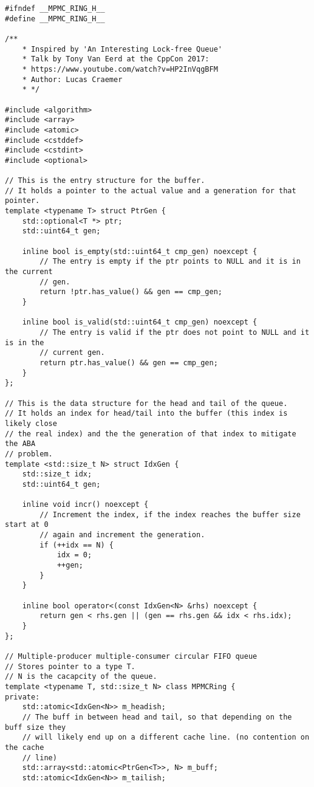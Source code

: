 \begin{lstlisting}[caption={Van Eerd's "An Interesting Lock-free Queue"},label=append_mpmc]
#ifndef __MPMC_RING_H__
#define __MPMC_RING_H__

/**
    * Inspired by 'An Interesting Lock-free Queue'
    * Talk by Tony Van Eerd at the CppCon 2017:
    * https://www.youtube.com/watch?v=HP2InVqgBFM
    * Author: Lucas Craemer
    * */

#include <algorithm>
#include <array>
#include <atomic>
#include <cstddef>
#include <cstdint>
#include <optional>

// This is the entry structure for the buffer.
// It holds a pointer to the actual value and a generation for that pointer.
template <typename T> struct PtrGen {
    std::optional<T *> ptr;
    std::uint64_t gen;

    inline bool is_empty(std::uint64_t cmp_gen) noexcept {
        // The entry is empty if the ptr points to NULL and it is in the current
        // gen.
        return !ptr.has_value() && gen == cmp_gen;
    }

    inline bool is_valid(std::uint64_t cmp_gen) noexcept {
        // The entry is valid if the ptr does not point to NULL and it is in the
        // current gen.
        return ptr.has_value() && gen == cmp_gen;
    }
};

// This is the data structure for the head and tail of the queue.
// It holds an index for head/tail into the buffer (this index is likely close
// the real index) and the the generation of that index to mitigate the ABA
// problem.
template <std::size_t N> struct IdxGen {
    std::size_t idx;
    std::uint64_t gen;

    inline void incr() noexcept {
        // Increment the index, if the index reaches the buffer size start at 0
        // again and increment the generation.
        if (++idx == N) {
            idx = 0;
            ++gen;
        }
    }

    inline bool operator<(const IdxGen<N> &rhs) noexcept {
        return gen < rhs.gen || (gen == rhs.gen && idx < rhs.idx);
    }
};

// Multiple-producer multiple-consumer circular FIFO queue
// Stores pointer to a type T.
// N is the cacapcity of the queue.
template <typename T, std::size_t N> class MPMCRing {
private:
    std::atomic<IdxGen<N>> m_headish;
    // The buff in between head and tail, so that depending on the buff size they
    // will likely end up on a different cache line. (no contention on the cache
    // line)
    std::array<std::atomic<PtrGen<T>>, N> m_buff;
    std::atomic<IdxGen<N>> m_tailish;


\end{lstlisting}
